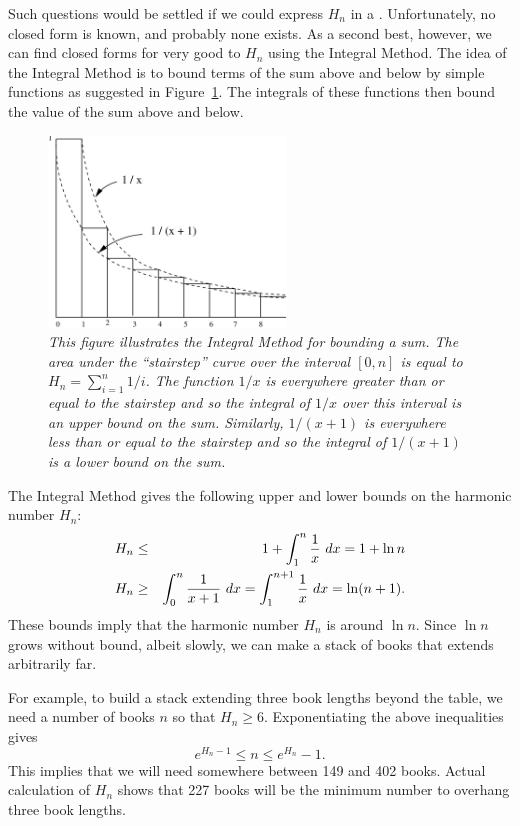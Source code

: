 Such questions would be settled if we could express $H_n$ in a .  Unfortunately, no closed form is known, and probably none
exists.  As a second best, however, we can find closed forms for very good
 to $H_n$ using the Integral Method.  The idea of the
Integral Method is to bound terms of the sum above and below by simple
functions as suggested in Figure~\ref{fig:integral}.  The integrals of
these functions then bound the value of the sum above and below.

\begin{figure}[htbp]
\centerline{\includegraphics[height=2.0in]{figures/integral}}
\caption{\em This figure illustrates the Integral Method for bounding
a sum.  The area under the ``stairstep'' curve over the interval $[0,
n]$ is equal to $H_n = \sum_{i=1}^n 1/i$.  The function $1/x$ is
everywhere greater than or equal to the stairstep and so the integral
of $1/x$ over this interval is an upper bound on the sum.  Similarly,
$1/(x+1)$ is everywhere less than or equal to the stairstep and so the
integral of $1/(x+1)$ is a lower bound on the sum.}
\label{fig:integral}
\end{figure}

The Integral Method gives the following upper and lower bounds on the
harmonic number $H_n$:
\begin{eqnarray}
H_n & \leq & 1 + \int_1^n \frac{1}{x} \ dx = 1 + \ln n \label{Hnl}\\
H_n & \geq & \int_0^n \frac{1}{x+1} \ dx = \int_1^{n+1} \frac{1}{x} \ dx = \ln(n+1).\notag
\end{eqnarray}
These bounds imply that the harmonic number $H_n$ is around $\ln n$.
Since $\ln n$ grows without bound, albeit slowly, we can make a stack
of books that extends arbitrarily far.

For example, to build a stack extending three book lengths beyond the
table, we need a number of books $n$ so that $H_n \ge 6$.
Exponentiating the above inequalities gives
\[ %
e^{H_n - 1} \leq  n  \leq e^{H_n} - 1.
\] %
This implies that we will need somewhere between 149 and 402 books.
Actual calculation of $H_n$ shows that 227 books will be the minimum
number to overhang three book lengths.


